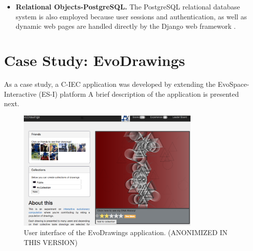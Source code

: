 \begin{itemize}
\item {\bf Relational Objects-PostgreSQL.}
  The PostgreSQL relational database system is also employed because user 
  sessions and authentication,
  as well as dynamic web pages are handled directly by the Django web
  framework \cite{garcia2013evospace}. %

\end{itemize}

\section{Case Study: EvoDrawings}
\label{sec:evodraw}
As a case study, a C-IEC application was developed by extending the 
EvoSpace-Interactive (ES-I) platform \cite{garcia2013evospace}
A brief description of the application is presented next.

\begin{figure}[!t]
    \centering
        \includegraphics[width=3.5in]{img/interface.png}
    \caption{User interface of the EvoDrawings application. (ANONIMIZED IN THIS VERSION)}
    \label{fig:web}
\end{figure}


